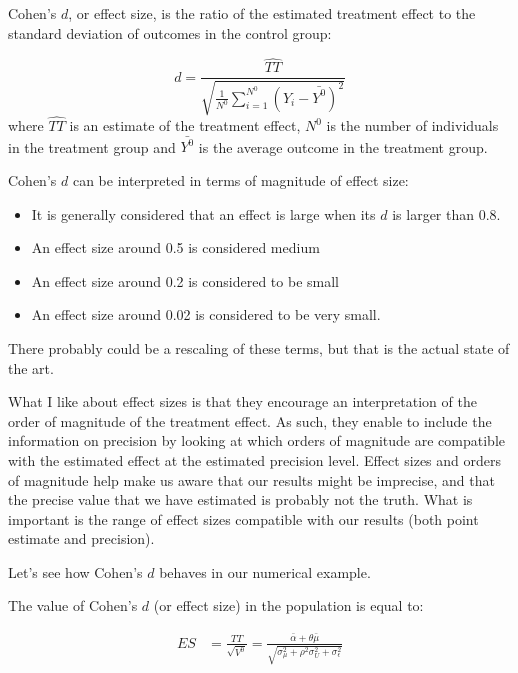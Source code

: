 \documentclass[]{book}
\providecommand{\tightlist}{%
  \setlength{\itemsep}{0pt}\setlength{\parskip}{0pt}}
\theoremstyle{definition}
\theoremstyle{definition}
\theoremstyle{definition}
\theoremstyle{remark}
\let\BeginKnitrBlock\begin \let\EndKnitrBlock\end
\begin{document}
\BeginKnitrBlock{definition}[Cohen's $d$]
\protect\hypertarget{def:unnamed-chunk-40}{}{\label{def:unnamed-chunk-40}
\iffalse (Cohen's \(d\)) \fi{} }Cohen's \(d\), or effect size, is the
ratio of the estimated treatment effect to the standard deviation of
outcomes in the control group:
\EndKnitrBlock{definition}

\[
d = \frac{\hat{TT}}{\sqrt{\frac{1}{N^0}\sum_{i=1}^{N^0}(Y_i-\bar{Y^0})^2}}
\] where \(\hat{TT}\) is an estimate of the treatment effect, \(N^0\) is
the number of individuals in the treatment group and \(\bar{Y^0}\) is
the average outcome in the treatment group.

Cohen's \(d\) can be interpreted in terms of magnitude of effect size:

\begin{itemize}
\tightlist
\item
  It is generally considered that an effect is large when its \(d\) is
  larger than 0.8.
\item
  An effect size around 0.5 is considered medium
\item
  An effect size around 0.2 is considered to be small
\item
  An effect size around 0.02 is considered to be very small.
\end{itemize}

There probably could be a rescaling of these terms, but that is the
actual state of the art.

What I like about effect sizes is that they encourage an interpretation
of the order of magnitude of the treatment effect. As such, they enable
to include the information on precision by looking at which orders of
magnitude are compatible with the estimated effect at the estimated
precision level. Effect sizes and orders of magnitude help make us aware
that our results might be imprecise, and that the precise value that we
have estimated is probably not the truth. What is important is the range
of effect sizes compatible with our results (both point estimate and
precision).

\BeginKnitrBlock{example}
\protect\hypertarget{exm:unnamed-chunk-41}{}{\label{exm:unnamed-chunk-41}
}Let's see how Cohen's \(d\) behaves in our numerical example.
\EndKnitrBlock{example}

The value of Cohen's \(d\) (or effect size) in the population is equal
to:

\begin{align*}
  ES & = \frac{TT}{\sqrt{V^0}} = \frac{\bar{\alpha}+\theta\bar{\mu}}{\sqrt{\sigma^2_{\mu}+\rho^2\sigma^2_{U}+\sigma^2_{\epsilon}}}
\end{align*}
\end{document}
